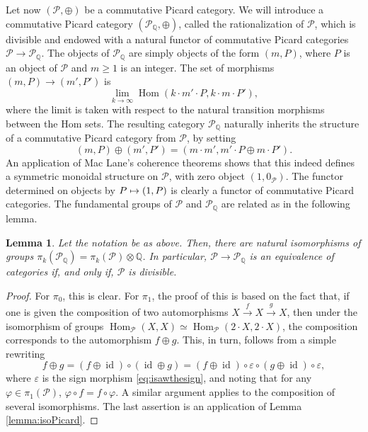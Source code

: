 \documentclass[JEP,XML,SOM,Unicode,published]{cedram}
\newcommand\mto{\mathchoice{\longmapsto}{\mapsto}{\mapsto}{\mapsto}}
\theoremstyle{plain}
\newtheorem{lemma}[theorem]{Lemma}
\theoremstyle{definition}
\newcommand{\QBbb}{\mathbb Q}
\newcommand{\Pcal}{\mathcal P}
\DeclareMathOperator{\Hom}{Hom}
\DeclareMathOperator{\id}{id}
\begin{document}
Let now $(\Pcal,\oplus)$ be a commutative Picard category. We will introduce a commutative Picard category $(\Pcal_{\QBbb}, \oplus)$, called the rationalization of $\Pcal$, which is divisible and endowed with a natural functor of commutative Picard categories $\Pcal \to \Pcal_{\QBbb}$. The objects of $\Pcal_{\QBbb}$ are simply objects of the form $(m, P)$, where $P$ is an object of $\Pcal$ and $m\geq 1$ is an integer. The set of morphisms $(m,P) \to (m', P')$ is
\begin{displaymath}
\lim_{k \to \infty} \Hom(k \cdot m'\cdot P, k \cdot m\cdot P'),
\end{displaymath}
where the limit is taken with respect to the natural transition morphisms between the Hom sets. The resulting category $\Pcal_{\QBbb}$ naturally inherits the structure of a commutative Picard category from $\Pcal$, by setting
\begin{displaymath}
(m,P) \oplus (m', P') = (m \cdot m', m' \cdot P \oplus m \cdot P').
\end{displaymath}
An application of Mac Lane's coherence theorems shows that this indeed defines a symmetric monoidal structure on $\Pcal$, with zero object $(1,0_{\Pcal})$. The functor determined on objects by $P \mto (1,P)$ is clearly a functor of commutative Picard categories. The fundamental groups of $\Pcal$ and $\Pcal_{\QBbb}$ are related as in the following lemma.
\begin{lemma}
Let the notation be as above. Then, there are natural isomorphisms of groups $\pi_{k}(\Pcal_{\QBbb})=\pi_{k}(\Pcal)\otimes\QBbb$. In particular, $\Pcal \to \Pcal_\QBbb$ is an equivalence of categories if, and only if, $\Pcal$ is divisible.
\end{lemma}
\begin{proof}
For $\pi_{0}$, this is clear. For $\pi_{1}$, the proof of this is based on the fact that, if one is given the composition of two automorphisms $X \stackrel{f}{\to} X \stackrel{g}{\to} X$, then under the isomorphism of groups $\Hom_{\Pcal}(X, X) \simeq \Hom_{\Pcal} (2\cdot X, 2\cdot X)$, the composition corresponds to the automorphism $f\oplus g$. This, in turn, follows from a simple rewriting\vspace*{-3pt}
\begin{displaymath}
f\oplus g = (f \oplus \id) \circ (\id \oplus g) = (f \oplus \id) \circ \varepsilon \circ (g \oplus \id) \circ \varepsilon,
\end{displaymath}
where $\varepsilon$ is the sign morphism \eqref{eq:isawthesign}, and noting that for any $\varphi \in \pi_1(\Pcal)$, $\varphi \circ f = f \circ \varphi$. A similar argument applies to the composition of several isomorphisms. The last assertion is an application of Lemma \ref{lemma:isoPicard}.
\end{proof}
\end{document}
